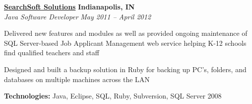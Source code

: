 %
    \headerrow
        {\textbf{\href{http://www.searchsoft.net/}{SearchSoft Solutions}}}
        {\textbf{Indianapolis, IN}}
    \\
    \headerrow
        {\emph{Java Software Developer}}
        {\emph{May 2011 -- April 2012}}
    \begin{itemize*}
        \item Delivered new features and modules as well as provided ongoing maintenance of SQL Server-based
                Job Applicant Management web service helping K-12 schools find qualified teachers and staff
        \item Designed and built a backup solution in Ruby for backing up PC's, folders, and databases on multiple
                machines across the LAN
    \end{itemize*}

    \hspace{1.0em}
    \textbf{Technologies:} Java, Eclipse, SQL, Ruby, Subversion, SQL Server 2008
